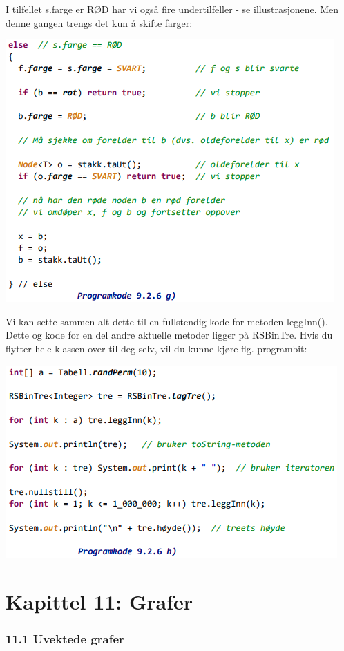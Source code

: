 \documentclass[11pt]{article}
\begin{document}
\newpage

        I tilfellet s.farge er RØD har vi også fire undertilfeller - se illustrasjonene. Men denne gangen
        trengs det kun å skifte farger:

        \includegraphics[center]{pk-9.2.6g.png}

        Vi kan sette sammen alt dette til en fullstendig kode for metoden leggInn(). Dette og kode
        for en del andre aktuelle metoder ligger på RSBinTre. Hvis du flytter hele klassen over til deg
        selv, vil du kunne kjøre flg. programbit:

        \includegraphics[center]{pk-9.2.6h.png}

\newpage
\part{Kapittel 11: Grafer}

\section{11.1 Uvektede grafer}
\end{document}
